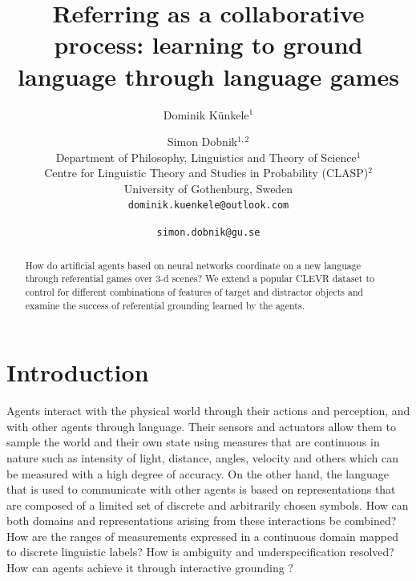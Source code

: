 \documentclass[11pt]{article}
\title{Referring as a collaborative process: learning to ground \\ language through language games} %
\author{Dominik Künkele$^{1}$ \and Simon Dobnik$^{1,2}$ \\
        Department of Philosophy, Linguistics and Theory of Science$^{1}$ \\ 
        Centre for Linguistic Theory and Studies in Probability (CLASP)$^{2}$ \\
        University of Gothenburg, Sweden \\
        \texttt{dominik.kuenkele@outlook.com} \and \texttt{simon.dobnik@gu.se}}
\begin{document}
\maketitle
\begin{abstract}
  How do artificial agents based on neural networks coordinate on a new language through referential games over 3-d scenes?
  We extend a popular CLEVR dataset to control for different combinations of features of target and distractor objects and examine the success of referential grounding learned by the agents.
\end{abstract}

\section{Introduction}

Agents interact with the physical world through their actions and perception, and with other agents through language.
Their sensors and actuators %
allow them to sample the world and their own state using measures that are continuous in nature such as intensity of light, distance, angles, velocity and others which can be measured with a high degree of accuracy.
On the other hand, the language that is used to communicate with other agents is based on representations that are composed of a limited set of discrete and arbitrarily chosen symbols.
How can both domains and representations arising from these interactions be combined? How are the ranges of measurements expressed in a continuous domain mapped to discrete linguistic labels?
How is ambiguity and underspecification resolved?
How can agents achieve it through interactive grounding \citep{Regier:1996,Roy:2005,Cooper:2023aa}?


\end{document}
